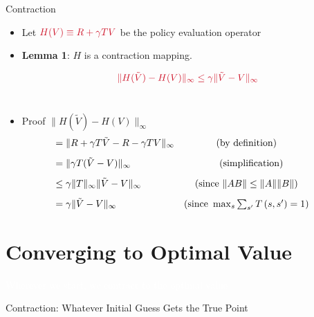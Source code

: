 \documentclass[11pt,table]{beamer}
\begin{document}
\begin{frame}{Contraction}

\begin{itemize}
    \item  Let $\textcolor{red1}{H(V) \equiv R+\gamma T V}$ be the policy evaluation operator 
    
    \item \textbf{Lemma 1}: $H$ is a \textcolor{red1}{contraction mapping}.

$$
\textcolor{red1}{\|H(\tilde{V})-H(V)\|_{\infty} \leq \gamma\|\tilde{V}-V\|_{\infty}}
$$\\[2ex]

\pause

\item Proof $\|H(\tilde{V})-H(V)\|_{\infty}$
$$
\hspace{-4mm}\begin{array}{lc}
=\|R+\gamma T \tilde{V}-R-\gamma T V\|_{\infty} & \text { (by definition) } \\[2ex]
=\|\gamma T(\tilde{V}-V)\|_{\infty} & \quad \text { (simplification) } \\[2ex]
\leq \gamma\|T\|_{\infty}\|\tilde{V}-V\|_{\infty} & (\text{since }\|A B\| \leq\|A\|\|B\|) \\[2ex]
=\gamma\|\tilde{V}-V\|_{\infty} & \left(\text{since } \max _{s} \sum_{s^{\prime}} T\left(s, s^{\prime}\right)=1\right)
\end{array}
$$ 
\end{itemize}
    
\end{frame}



\section{Converging to Optimal Value}
{
\begin{frame}
\centering
\Huge
\textcolor{white}{Wherever we start, we contract to the optimal value}
\thispagestyle{empty}
\end{frame}
}


\begin{frame}{Contraction: Whatever Initial Guess Gets the True Point}
\begin{figure}
	\centering
{}
\end{figure}

\end{frame}
\end{document}

